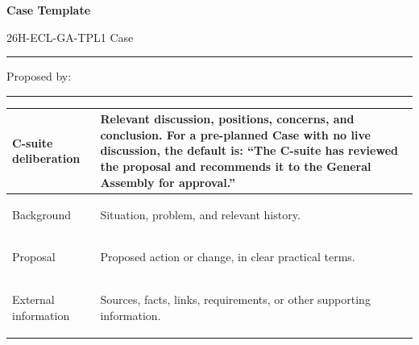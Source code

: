 \documentclass{../../../Common/Latex/Templates/rapport}
\date{\meetingdate, \meetingtime}
\begin{document}
\reportmainmatter
\small
\setlength{\parindent}{0pt}
\setlength{\tabcolsep}{6pt}
\renewcommand{\arraystretch}{1.2}

\begin{center}
  {\Large\bfseries Case Template}\par
  \vspace{0.15cm}
  {\normalsize 26H-ECL-GA-TPL1 \textperiodcentered{} Case \rule{1cm}{0.4pt} \textperiodcentered{} Proposed by: \rule{4cm}{0.4pt}}\par
  \vspace{0.1cm}
  {\small \meetingline}\par
\end{center}

\vspace{0.3cm}
\begin{tabularx}{\textwidth}{|>{\bfseries\raggedright\arraybackslash}p{4.2cm}|X|}
  \hline
  C-suite deliberation & \rule{0pt}{4.1cm}Relevant discussion, positions, concerns, and conclusion. For a pre-planned Case with no live discussion, the default is: ``The C-suite has reviewed the proposal and recommends it to the General Assembly for approval.''             \\
  \hline
  Background           & \rule{0pt}{4.1cm}Situation, problem, and relevant history.                             \\
  \hline
  Proposal             & \rule{0pt}{4.1cm}Proposed action or change, in clear practical terms.                  \\
  \hline
  External information & \rule{0pt}{4.1cm}Sources, facts, links, requirements, or other supporting information. \\
  \hline
\end{tabularx}
\end{document}
